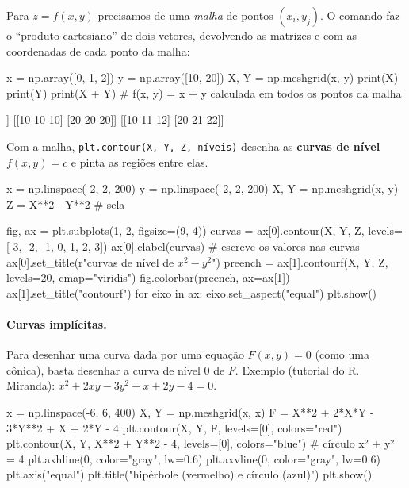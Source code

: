 Para $z=f(x,y)$ precisamos de uma \emph{malha} de pontos $(x_i, y_j)$. O comando  faz o ``produto
cartesiano'' de dois vetores, devolvendo as matrizes  e  com as coordenadas de cada ponto da malha:

\begin{entrada}
x = np.array([0, 1, 2])
y = np.array([10, 20])
X, Y = np.meshgrid(x, y)
print(X)
print(Y)
print(X + Y)        # f(x, y) = x + y calculada em todos os pontos da malha
\end{entrada}
\begin{saida}
[[0 1 2]
 [0 1 2]]
[[10 10 10]
 [20 20 20]]
[[10 11 12]
 [20 21 22]]
\end{saida}

Com a malha, \texttt{plt.contour(X, Y, Z, níveis)} desenha as \textbf{curvas de nível} $f(x,y)=c$ e
 pinta as regiões entre elas.

\begin{entrada}
x = np.linspace(-2, 2, 200)
y = np.linspace(-2, 2, 200)
X, Y = np.meshgrid(x, y)
Z = X**2 - Y**2                    # sela

fig, ax = plt.subplots(1, 2, figsize=(9, 4))
curvas = ax[0].contour(X, Y, Z, levels=[-3, -2, -1, 0, 1, 2, 3])
ax[0].clabel(curvas)                # escreve os valores nas curvas
ax[0].set_title(r"curvas de nível de $x^2-y^2$")
preench = ax[1].contourf(X, Y, Z, levels=20, cmap="viridis")
fig.colorbar(preench, ax=ax[1])
ax[1].set_title("contourf")
for eixo in ax:
    eixo.set_aspect("equal")
plt.show()
\end{entrada}

\paragraph{Curvas implícitas.} Para desenhar uma curva dada por uma equação $F(x,y)=0$ (como uma cônica), basta
desenhar a curva de nível 0 de $F$. Exemplo (tutorial do R. Miranda): $x^2+2xy-3y^2+x+2y-4=0$.

\begin{entrada}
x = np.linspace(-6, 6, 400)
X, Y = np.meshgrid(x, x)
F = X**2 + 2*X*Y - 3*Y**2 + X + 2*Y - 4
plt.contour(X, Y, F, levels=[0], colors="red")
plt.contour(X, Y, X**2 + Y**2 - 4, levels=[0], colors="blue")   # círculo x² + y² = 4
plt.axhline(0, color="gray", lw=0.6)
plt.axvline(0, color="gray", lw=0.6)
plt.axis("equal")
plt.title("hipérbole (vermelho) e círculo (azul)")
plt.show()
\end{entrada}

